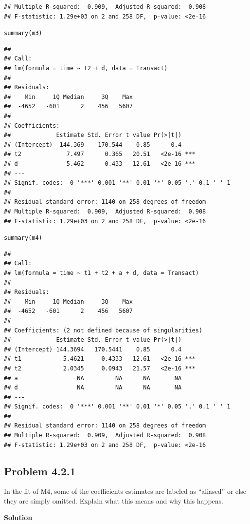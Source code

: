\documentclass[12pt,oneside,a4paper]{article}\usepackage[]{graphicx}\usepackage[]{xcolor}
\makeatletter
\newcommand{\hlstd}[1]{\textcolor[rgb]{0,0,0}{#1}}%
\newcommand{\hlkwd}[1]{\textcolor[rgb]{0,0,0}{#1}}%
\newenvironment{kframe}{%
 \def\at@end@of@kframe{}%
 \ifinner\ifhmode%
  \def\at@end@of@kframe{\end{minipage}}%
  \begin{minipage}{\columnwidth}%
 \fi\fi%
 \def\FrameCommand##1{\hskip\@totalleftmargin \hskip-\fboxsep
 \colorbox{shadecolor}{##1}\hskip-\fboxsep
     \hskip-\linewidth \hskip-\@totalleftmargin \hskip\columnwidth}%
 \MakeFramed {\advance\hsize-\width
   \@totalleftmargin\z@ \linewidth\hsize
   \@setminipage}}%
 {\par\unskip\endMakeFramed%
 \at@end@of@kframe}
\newenvironment{knitrout}{}{} %
\newcommand{\subproblem}[1]
{
    \subsection*{Problem {#1}}
}
\newcommand{\solution}
{
    \vspace{15pt}
    \noindent\ignorespaces\textbf{\large Solution}
}
\makeatother
\begin{document}
\begin{knitrout}
\begin{kframe}
\begin{verbatim}
## Multiple R-squared:  0.909,	Adjusted R-squared:  0.908 
## F-statistic: 1.29e+03 on 2 and 258 DF,  p-value: <2e-16
\end{verbatim}
\begin{alltt}
\hlkwd{summary}\hlstd{(m3)}
\end{alltt}
\begin{verbatim}
## 
## Call:
## lm(formula = time ~ t2 + d, data = Transact)
## 
## Residuals:
##    Min     1Q Median     3Q    Max 
##  -4652   -601      2    456   5607 
## 
## Coefficients:
##             Estimate Std. Error t value Pr(>|t|)    
## (Intercept)  144.369    170.544    0.85      0.4    
## t2             7.497      0.365   20.51   <2e-16 ***
## d              5.462      0.433   12.61   <2e-16 ***
## ---
## Signif. codes:  0 '***' 0.001 '**' 0.01 '*' 0.05 '.' 0.1 ' ' 1
## 
## Residual standard error: 1140 on 258 degrees of freedom
## Multiple R-squared:  0.909,	Adjusted R-squared:  0.908 
## F-statistic: 1.29e+03 on 2 and 258 DF,  p-value: <2e-16
\end{verbatim}
\begin{alltt}
\hlkwd{summary}\hlstd{(m4)}
\end{alltt}
\begin{verbatim}
## 
## Call:
## lm(formula = time ~ t1 + t2 + a + d, data = Transact)
## 
## Residuals:
##    Min     1Q Median     3Q    Max 
##  -4652   -601      2    456   5607 
## 
## Coefficients: (2 not defined because of singularities)
##             Estimate Std. Error t value Pr(>|t|)    
## (Intercept) 144.3694   170.5441    0.85      0.4    
## t1            5.4621     0.4333   12.61   <2e-16 ***
## t2            2.0345     0.0943   21.57   <2e-16 ***
## a                 NA         NA      NA       NA    
## d                 NA         NA      NA       NA    
## ---
## Signif. codes:  0 '***' 0.001 '**' 0.01 '*' 0.05 '.' 0.1 ' ' 1
## 
## Residual standard error: 1140 on 258 degrees of freedom
## Multiple R-squared:  0.909,	Adjusted R-squared:  0.908 
## F-statistic: 1.29e+03 on 2 and 258 DF,  p-value: <2e-16
\end{verbatim}
\end{kframe}
\end{knitrout}

\subproblem{4.2.1}
In the fit of M4, some of the coefficients estimates are labeled as “aliased” or else they are simply omitted. Explain what this means and why this happens.

\solution
\end{document}
